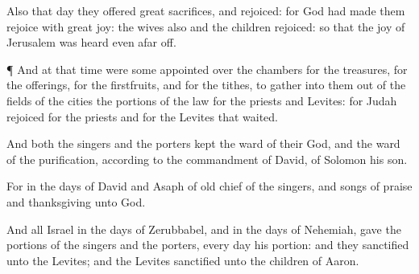 {Also that
day they
offered
great
sacrifices, and
rejoiced: for
God had made them
rejoice with
great
joy: the
wives also and the
children
rejoiced: so that the
joy of
Jerusalem was
heard even afar
off.


\par }{\PP {}¶ And at that
time were
some
appointed over the
chambers for the
treasures, for the
offerings, for the
firstfruits, and for the
tithes, to
gather into them out of the
fields of the
cities the
portions of the
law for the
priests and
Levites: for
Judah
rejoiced for the
priests and for the
Levites that
waited.

And both the
singers and the
porters
kept the
ward of their
God, and the
ward of the
purification, according to the
commandment of
David,
{} of
Solomon his
son.

For in the
days of
David and
Asaph of
old
{}
chief of the
singers, and
songs of
praise and
thanksgiving unto
God.

And all
Israel in the
days of
Zerubbabel, and in the
days of
Nehemiah,
gave the
portions of the
singers and the
porters, every
day his
portion: and they
sanctified
{} unto the
Levites; and the
Levites
sanctified
{} unto the
children of
Aaron.




\par }
